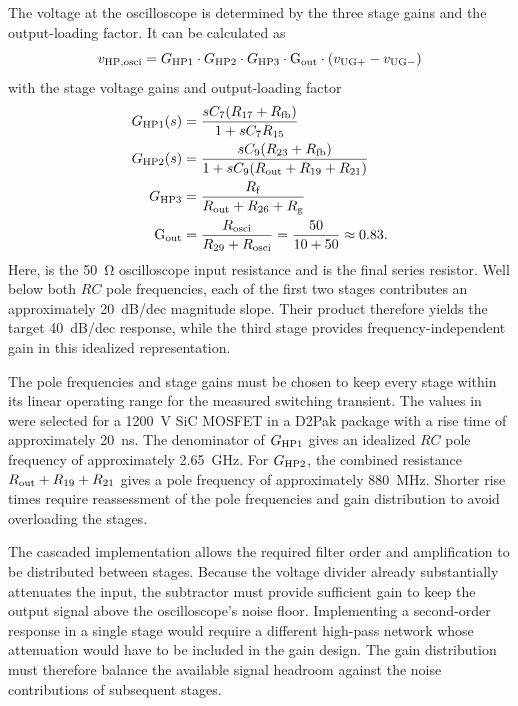 The voltage at the oscilloscope is determined by the three stage gains and the output-loading factor.
It can be calculated as
\begin{equation}
	{v}_{\mathrm{HP,osci}} = {G}_{\mathrm{HP1}} \cdot {G}_{\mathrm{HP2}} \cdot {G}_{\mathrm{HP3}} \cdot \text{G}_{\text{out}} \cdot ({v}_{\mathrm{UG+}} - {v}_{\mathrm{UG-}})
\end{equation}
with the stage voltage gains and output-loading factor
\begin{align}
	{G}_{\mathrm{HP1}}(s) &= \frac{s{C}_{\mathrm{7}}({R}_{\mathrm{17}}+ {R}_{\mathrm{fb}})}{1+s{C}_{\mathrm{7}}{R}_{\mathrm{15}}}\\
	{G}_{\mathrm{HP2}}(s) &= \frac{s{C}_{\mathrm{9}}({R}_{\mathrm{23}}+ {R}_{\mathrm{fb}})}{1+s{C}_{\mathrm{9}}({R}_{\mathrm{out}}+{R}_{\mathrm{19}}+{R}_{\mathrm{21}})}\\
	{G}_{\mathrm{HP3}} &= \frac{{R}_{\mathrm{f}}}{{R}_{\mathrm{out}}+{R}_{\mathrm{26}}+{R}_{\mathrm{g}}}\\
	\text{G}_{\text{out}} &= \frac{{R}_{\mathrm{osci}}}{{R}_{\mathrm{29}}+{R}_{\mathrm{osci}}} = \frac{50}{10+50} \approx 0.83.
\end{align}
Here,  is the \SI{50}{\ohm} oscilloscope input resistance and  is the final series resistor.
Well below both $RC$ pole frequencies, each of the first two stages contributes an approximately \SI{+20}{dB/dec} magnitude slope.
Their product therefore yields the target \SI{+40}{dB/dec} response, while the third stage provides frequency-independent gain in this idealized representation.

The pole frequencies and stage gains must be chosen to keep every stage within its linear operating range for the measured switching transient.
The values in  were selected for a \SI{1200}{V} SiC MOSFET in a D2Pak package with a rise time of approximately \SI{20}{ns}.
The denominator of ${G}_{\mathrm{HP1}}$ gives an idealized $RC$ pole frequency of approximately \SI{2.65}{GHz}.
For ${G}_{\mathrm{HP2}}$, the combined resistance ${R}_{\mathrm{out}}+{R}_{\mathrm{19}}+{R}_{\mathrm{21}}$ gives a pole frequency of approximately \SI{880}{MHz}.
Shorter rise times require reassessment of the pole frequencies and gain distribution to avoid overloading the stages.

The cascaded implementation allows the required filter order and amplification to be distributed between stages.
Because the voltage divider already substantially attenuates the input, the subtractor must provide sufficient gain to keep the output signal above the oscilloscope's noise floor.
Implementing a second-order response in a single stage would require a different high-pass network whose attenuation would have to be included in the gain design.
The gain distribution must therefore balance the available signal headroom against the noise contributions of subsequent stages.

